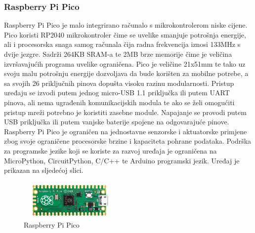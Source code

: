 \documentclass[times, utf8, diplomski]{fer}
\begin{document}
\subsubsection{Raspberry Pi Pico}
Raspberry Pi Pico\citep{RPiPico} je malo integrirano računalo s mikrokontrolerom niske cijene. Pico koristi RP2040 mikrokontroler čime se uvelike smanjuje potrošnja energije, ali i procesorska snaga samog računala čija radna frekvencija iznosi 133MHz s dvije jezgre. Sadrži 264KB SRAM-a te 2MB brze memorije čime je veličina izvršavajućih programa uvelike ograničena. Pico je veličine 21x51mm te tako uz svoju malu potrošnju energije dozvoljava da bude korišten za mobilne potrebe, a sa svojih 26 priključnih pinova dopušta visoku razinu modularnosti. Pristup uređaju se izvodi putem jednog micro-USB 1.1 priključka ili putem UART pinova, ali nema ugrađenih komunikacijskih modula te ako se želi omogućiti pristup mreži potrebno je koristiti zasebne module. Napajanje se provodi putem USB priključka ili putem vanjske baterije spojene na odgovarajuće pinove. Raspberry Pi Pico je ograničen na jednostavne senzorske i aktuatorske primjene zbog svoje ograničene procesorske brzine i kapaciteta pohrane podataka. Podrška za programske jezike koji se koriste za razvoj uređaja je ograničena na MicroPython, CircuitPython, C/C++ te Arduino programski jezik. Uređaj je prikazan na sljedećoj slici.
\begin{figure}[htb]
    \centering
    \includegraphics[width=5cm]{images/rpipico.jpg}
    \caption{Raspberry Pi Pico\citep{RPiPicoImg}}
    \label{fig:rpipico}
\end{figure}
\end{document}
